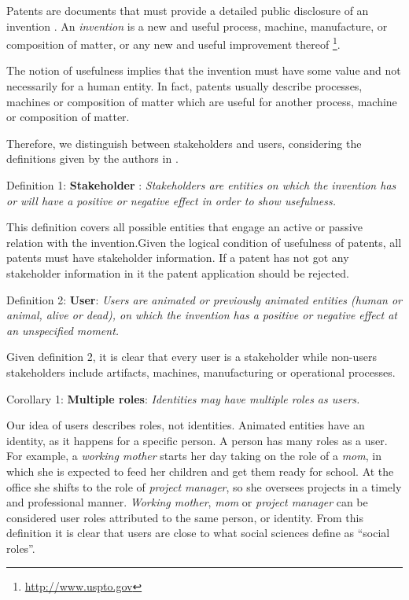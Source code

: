 \documentclass[]{book}
\let\rmarkdownfootnote\footnote%
\def\footnote{\protect\rmarkdownfootnote}
\begin{document}
Patents are documents that must provide a detailed public disclosure of
an invention \citep{wipo2}. An \emph{invention} is a new and useful
process, machine, manufacture, or composition of matter, or any new and
useful improvement thereof \footnote{\url{http://www.uspto.gov}}.

The notion of usefulness implies that the invention must have some value
and not necessarily for a human entity. In fact, patents usually
describe processes, machines or composition of matter which are useful
for another process, machine or composition of matter.

Therefore, we distinguish between stakeholders and users, considering
the definitions given by the authors in \citep{bonam2017}.

Definition 1: \textbf{Stakeholder} : \emph{Stakeholders are entities on
which the invention has or will have a positive or negative effect in
order to show usefulness.}

This definition covers all possible entities that engage an active or
passive relation with the invention.Given the logical condition of
usefulness of patents, all patents must have stakeholder information. If
a patent has not got any stakeholder information in it the patent
application should be rejected.

Definition 2: \textbf{User}: \emph{Users are animated or previously
animated entities (human or animal, alive or dead), on which the
invention has a positive or negative effect at an unspecified moment.}

Given definition 2, it is clear that every user is a stakeholder while
non-users stakeholders include artifacts, machines, manufacturing or
operational processes.

Corollary 1: \textbf{Multiple roles}: \emph{Identities may have multiple
roles as users.}

Our idea of users describes roles, not identities. Animated entities
have an identity, as it happens for a specific person. A person has many
roles as a user. For example, a \emph{working mother} starts her day
taking on the role of a \emph{mom}, in which she is expected to feed her
children and get them ready for school. At the office she shifts to the
role of \emph{project manager}, so she oversees projects in a timely and
professional manner. \emph{Working mother}, \emph{mom} or \emph{project
manager} can be considered user roles attributed to the same person, or
identity. From this definition it is clear that users are close to what
social sciences define as ``social roles''.
\end{document}
